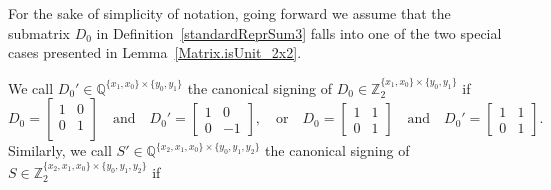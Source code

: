 For the sake of simplicity of notation, going forward we assume that the submatrix $D_{0}$ in Definition~\ref{standardReprSum3} falls into one of the two special cases presented in Lemma~\ref{Matrix.isUnit_2x2}.

\begin{definition}
    \label{matrix3x3signed}
    \leanok
    We call $D_{0}' \in \mathbb{Q}^{\{x_{1}, x_{0}\} \times \{y_{0}, y_{1}\}}$ the canonical signing of $D_{0} \in \mathbb{Z}_{2}^{\{x_{1}, x_{0}\} \times \{y_{0}, y_{1}\}}$ if
    \[
        D_{0} = \begin{bmatrix}
            1 & 0 \\
            0 & 1 \\
        \end{bmatrix}
        \quad \text{and} \quad
        D_{0}' = \begin{bmatrix}
            1 & 0 \\
            0 & -1
        \end{bmatrix},
        \quad \text{or} \quad
        D_{0} = \begin{bmatrix}
            1 & 1 \\
            0 & 1
        \end{bmatrix}
        \quad \text{and} \quad
        D_{0}' = \begin{bmatrix}
            1 & 1 \\
            0 & 1
        \end{bmatrix}.
    \]
    Similarly, we call $S' \in \mathbb{Q}^{\{x_{2}, x_{1}, x_{0}\} \times \{y_{0}, y_{1}, y_{2}\}}$ the canonical signing of $S \in \mathbb{Z}_{2}^{\{x_{2}, x_{1}, x_{0}\} \times \{y_{0}, y_{1}, y_{2}\}}$ if
    \begin{center}
        \noindent
\end{center}
\end{definition}
